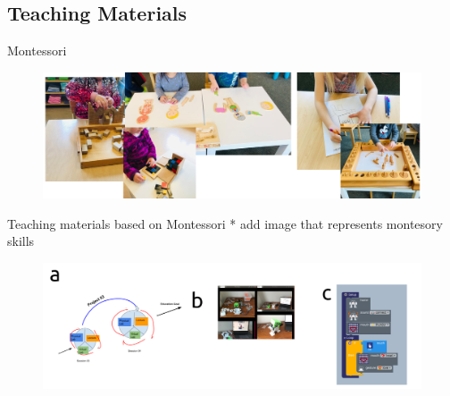\subsection{Teaching Materials}


{
\begin{frame}{Montessori}

    \begin{figure}
        \centering
        \includegraphics[width=1.0\textwidth]{./figures/montessori/versions/drawing-v00.png}
      \end{figure}
\end{frame}
}

{
\begin{frame}{Teaching materials based on Montessori}
* add image that represents montesory skills
      \begin{figure}
        \centering
        \includegraphics[width=1.0\textwidth]{./figures/teaching-materials/versions/drawing-v01.png}
      \end{figure}
\end{frame}
}
